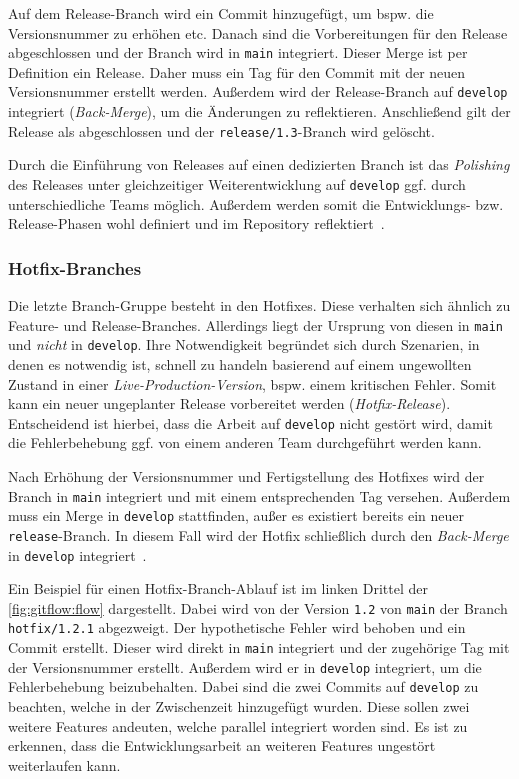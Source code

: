 Auf dem Release\hyp Branch wird ein Commit hinzugefügt, um bspw. die Versionsnummer zu erhöhen etc. Danach sind die Vorbereitungen für den Release abgeschlossen und der Branch wird in \texttt{main} integriert. Dieser Merge ist per Definition ein Release. Daher muss ein Tag für den Commit mit der neuen Versionsnummer erstellt werden. Außerdem wird der Release\hyp Branch auf \texttt{develop} integriert (\emph{Back\hyp Merge}), um die Änderungen zu reflektieren. Anschließend gilt der Release als abgeschlossen und der \texttt{release/1.3}-Branch wird gelöscht.

Durch die Einführung von Releases auf einen dedizierten Branch ist das \emph{Polishing} des Releases unter gleichzeitiger Weiterentwicklung auf \texttt{develop} ggf. durch unterschiedliche Teams möglich. Außerdem werden somit die Entwicklungs- bzw. Release\hyp Phasen wohl definiert und im Repository reflektiert~\cite{atlassianGitflowWorkflow}.


\subsubsection{Hotfix-Branches}

Die letzte Branch-Gruppe besteht in den Hotfixes. Diese verhalten sich ähnlich zu Feature- und Release\hyp Branches. Allerdings liegt der Ursprung von diesen in \texttt{main} und \emph{nicht} in \texttt{develop}. Ihre Notwendigkeit begründet sich durch Szenarien, in denen es notwendig ist, schnell zu handeln basierend auf einem ungewollten Zustand in einer \emph{Live-Production-Version}, bspw. einem kritischen Fehler. Somit kann ein neuer ungeplanter Release vorbereitet werden (\emph{Hotfix-Release}). Entscheidend ist hierbei, dass die Arbeit auf \texttt{develop} nicht gestört wird, damit die Fehlerbehebung ggf. von einem anderen Team durchgeführt werden kann.

Nach Erhöhung der Versionsnummer und Fertigstellung des Hotfixes wird der Branch in \texttt{main} integriert und mit einem entsprechenden Tag versehen. Außerdem muss ein Merge in \texttt{develop} stattfinden, außer es existiert bereits ein neuer \texttt{release}-Branch. In diesem Fall wird der Hotfix schließlich durch den \emph{Back-Merge} in \texttt{develop} integriert~\cite{driessenSuccessfulGitBranching2010}.

Ein Beispiel für einen Hotfix\hyp Branch\hyp Ablauf ist im linken Drittel der \autoref{fig:gitflow:flow} dargestellt. Dabei wird von der Version \verb|1.2| von \texttt{main} der Branch \texttt{hotfix/1.2.1} abgezweigt. Der hypothetische Fehler wird behoben und ein Commit erstellt. Dieser wird direkt in \texttt{main} integriert und der zugehörige Tag mit der Versionsnummer erstellt. Außerdem wird er in \texttt{develop} integriert, um die Fehlerbehebung beizubehalten. Dabei sind die zwei Commits auf \texttt{develop} zu beachten, welche in der Zwischenzeit hinzugefügt wurden. Diese sollen zwei weitere Features andeuten, welche parallel integriert worden sind. Es ist zu erkennen, dass die Entwicklungsarbeit an weiteren Features ungestört weiterlaufen kann.


